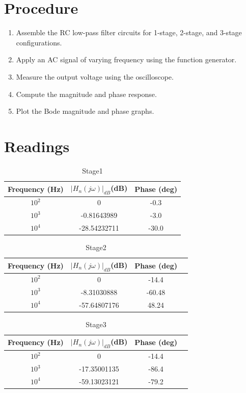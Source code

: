 \documentclass[a4paper,12pt]{article}
\begin{document}
\section*{Procedure}
\begin{enumerate}
    \item Assemble the RC low-pass filter circuits for 1-stage, 2-stage, and 3-stage configurations.
    \item Apply an AC signal of varying frequency using the function generator.
    \item Measure the output voltage using the oscilloscope.
    \item Compute the magnitude and phase response.
    \item Plot the Bode magnitude and phase graphs.
\end{enumerate}
\section*{Readings}
\begin{table}[H]
    \centering
    \begin{tabular}{|c|c|c|}
        \hline
        Frequency (Hz) &  $|H_n(j\omega)|_{dB}$(dB) & Phase (deg) \\
        \hline
        $10^2$ & 0 &-0.3 \\
        $10^3$ & -0.81643989 & -3.0 \\
        $10^4$ & -28.54232711& -30.0 \\
        \hline
    \end{tabular}
    \caption{Stage1}
\end{table}
\begin{table}[H]
    \centering
    \begin{tabular}{|c|c|c|c|}
        \hline
        Frequency (Hz) &  $|H_n(j\omega)|_{dB}$(dB) & Phase (deg) \\
        \hline
        $10^2$ & 0 &-14.4 \\
        $10^3$ & -8.31030888 & -60.48 \\
        $10^4$ & -57.64807176& 48.24 \\
        \hline
    \end{tabular}
    \caption{Stage2}
\end{table}
\begin{table}[H]
    \centering
    \begin{tabular}{|c|c|c|c|}
        \hline
        Frequency (Hz) &  $|H_n(j\omega)|_{dB}$(dB) & Phase (deg) \\
        \hline
        $10^2$ & 0 &-14.4 \\
        $10^3$ & -17.35001135 & -86.4 \\
        $10^4$ & -59.13023121& -79.2 \\
        \hline
    \end{tabular}
    \caption{Stage3}
\end{table}
\end{document}
